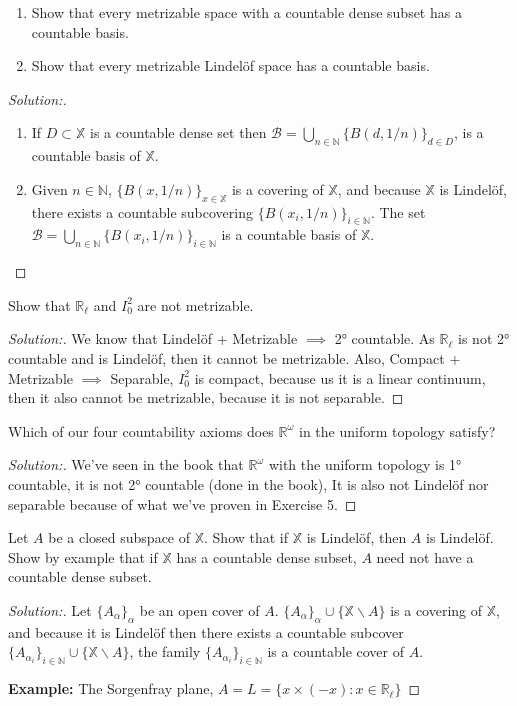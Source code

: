 \documentclass[a4paper,12pt, reqno]{article}
\theoremstyle{definition}
\newenvironment{exerr}[1]{
  \renewcommand\theexeralt{#1}
  \exeralt
}{\endexeralt}
\newenvironment{solution}{\begin{proof}[Solution:]}{\end{proof}}
\newcommand{\R}{\mathbb{R}}
\newcommand{\B}{\mathscr{B}}
\newcommand{\N}{\mathbb{N}}
\newcommand{\X}{\mathbb{X}}
\begin{document}
\begin{exerr}{5}\hfill
  \begin{enumerate}[label=(\alph*)]
    \item Show that every metrizable space with a countable dense subset has a countable basis.
    \item Show that every metrizable Lindelöf space has a countable basis.
  \end{enumerate}
\end{exerr}
\begin{solution}\hfill
  \begin{enumerate}[label=(\alph*)]
    \item If $D\subset\X$ is a countable dense set then $\B = \bigcup_{n\in\N}\{ B(d,1/n) \}_{d\in D}$, is a countable basis of $\X$.
    \item Given $n\in\N$, $\{ B(x,1/n) \}_{x\in\X}$ is a covering of $\X$, and because $\X$ is Lindelöf, there exists a countable subcovering $\{ B(x_{i},1/n) \}_{i\in\N}$. The set $\B = \bigcup_{n\in\N}\{ B(x_{i},1/n) \}_{i\in\N}$ is a countable basis of $\X$.
  \end{enumerate}
\end{solution}

\begin{exerr}{6}
  Show that $\R_{\ell}$ and $I_{0}^2$ are not metrizable.
\end{exerr}
\begin{solution}
  We know that Lindelöf + Metrizable $\implies$ 2° countable. As $\R_{\ell}$ is not 2° countable and is Lindelöf, then it cannot be metrizable. Also, Compact + Metrizable $\implies$ Separable, $I_{0}^2$ is compact, because us it is a linear continuum, then it also cannot be metrizable, because it is not separable.
\end{solution}

\begin{exerr}{8}
  Which of our four countability axioms does $\R^\omega$ in the uniform topology satisfy?
\end{exerr}
\begin{solution}
  We've seen in the book that $\R^\omega$ with the uniform topology is 1° countable, it is not 2° countable (done in the book), It is also not Lindelöf nor separable because of what we've proven in Exercise 5.
\end{solution}

\begin{exerr}{9}
  Let $A$ be a closed subspace of $\X$. Show that if $\X$ is Lindelöf, then $A$ is Lindelöf. Show by example that if $\X$ has a countable dense subset, $A$ need not have a countable dense subset.
\end{exerr}
\begin{solution}
  Let $\{ A_{\alpha} \}_{\alpha}$ be an open cover of $A$. $\{ A_{\alpha} \}_{\alpha}\cup\{ \X\backslash A \}$ is a covering of $\X$, and because it is Lindelöf then there exists a countable subcover $\{ A_{\alpha_{i}} \}_{i\in\N}\cup\{ \X\backslash A \}$, the family $\{ A_{\alpha_{i}} \}_{i\in\N}$ is a countable cover of $A$.

  \textbf{Example:} The Sorgenfray plane, $A = L = \{ x\times(-x) : x\in\R_{\ell} \}$
\end{solution}
\end{document}
